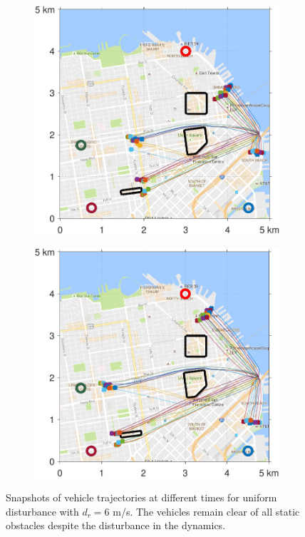 \begin{figure}[!htb]
\begin{subfigure}{0.5\textwidth}
  \includegraphics[width=\columnwidth]{figs/sf_d6sep0_s3}
  \subcaption{}
  \label{fig:sf_d6sep0_s3}
\end{subfigure}%
\begin{subfigure}{0.5\textwidth}
  \includegraphics[width=\columnwidth]{figs/sf_d6sep0_s4}
  \subcaption{}
  \label{fig:sf_d6sep0_s4}
\end{subfigure}%
\caption{Snapshots of vehicle trajectories at different times for uniform disturbance with $d_{r} = 6$ m/s. The vehicles remain clear of all static obstacles despite the disturbance in the dynamics.}
\label{fig:trajectories_sf_snapshots}
\end{figure}

